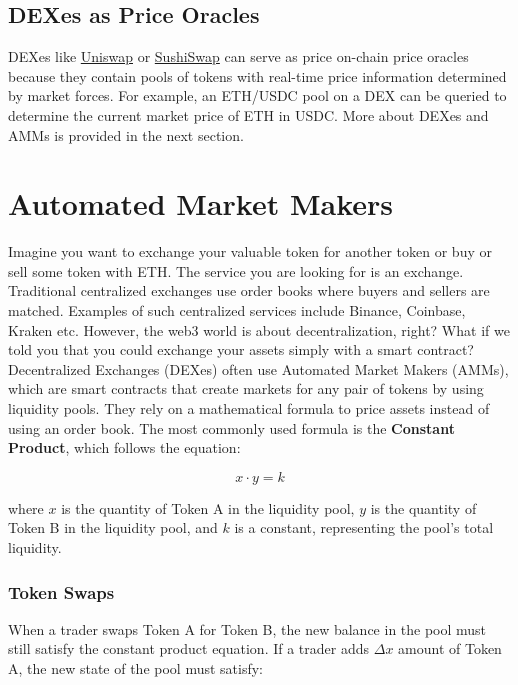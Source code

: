 \documentclass[12pt]{article}
\begin{document}
\subsection*{DEXes as Price Oracles}

DEXes like \href{https://app.uniswap.org/}{Uniswap} or \href{https://www.sushi.com/ethereum/swap}{SushiSwap} can serve as price on-chain price oracles because they contain pools of tokens with real-time price information determined by market forces. For example, an ETH/USDC pool on a DEX can be queried to determine the current market price of ETH in USDC. More about DEXes and AMMs is provided in the next section.

\newpage
\section{Automated Market Makers}

Imagine you want to exchange your valuable token for another token or buy or sell some token with ETH. The service you are looking for is an exchange. Traditional centralized exchanges use order books where buyers and sellers are matched. Examples of such centralized services include Binance, Coinbase, Kraken etc. However, the web3 world is about decentralization, right? What if we told you that you could exchange your assets simply with a smart contract? Decentralized Exchanges (DEXes) often use Automated Market Makers (AMMs), which are smart contracts that create markets for any pair of tokens by using liquidity pools. They rely on a mathematical formula to price assets instead of using an order book. The most commonly used formula is the \textbf{Constant Product}, which follows the equation:



\begin{equation}
  x \cdot y = k
\end{equation}

where \( x \) is the quantity of Token A in the liquidity pool, \( y \) is the quantity of Token B in the liquidity pool, and \( k \) is a constant, representing the pool's total liquidity.

\subsubsection*{Token Swaps}
When a trader swaps Token A for Token B, the new balance in the pool must still satisfy the constant product equation. If a trader adds \( \Delta x \) amount of Token A, the new state of the pool must satisfy:
\end{document}

